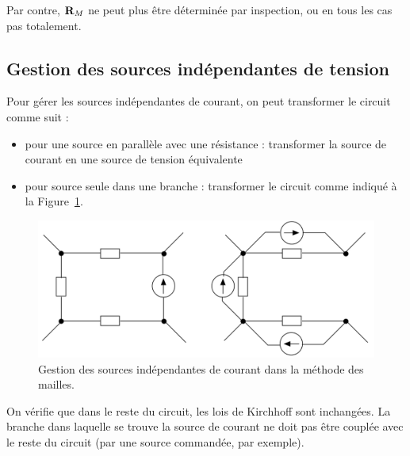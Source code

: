Par contre,  ${\bf R}_M$ ne peut plus être déterminée par inspection, ou en tous les cas pas totalement.

\subsection{Gestion des sources indépendantes de tension}

Pour gérer les sources indépendantes de courant, on peut transformer le circuit comme suit : 
\begin{itemize}
	\item pour une source en parallèle avec une résistance : transformer la source de
	courant en une source de tension  équivalente
	\item pour source seule dans une branche : transformer le circuit comme indiqué à la Figure~\ref{fig:transformation_SIT}.
\end{itemize}
\begin{figure}[htb]
	\centering
	\includegraphics[width=0.95\linewidth]{figs/methodes-generales/transformation_SIT}
	\caption{Gestion des sources indépendantes de courant dans la méthode des mailles.}
	\label{fig:transformation_SIT}
\end{figure}

On vérifie que dans le reste du circuit, les lois de Kirchhoff sont inchangées. La branche dans laquelle se trouve la source de courant ne doit pas être couplée avec le reste du circuit (par une source commandée, par exemple).

